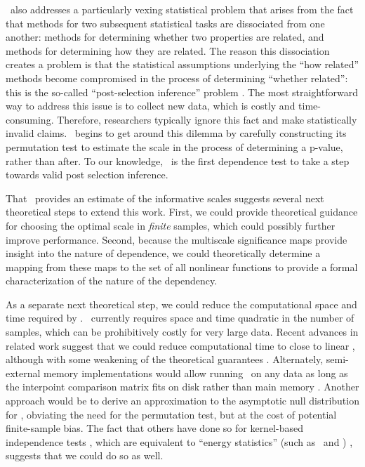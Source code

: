 \documentclass[11pt]{article}
\begin{document}
\Mgc~also addresses a particularly vexing statistical problem that arises from the fact that methods for two subsequent statistical tasks are dissociated from one another: methods for determining whether two properties are related, and methods for determining how they are related.
The reason this dissociation creates a problem is that the statistical assumptions underlying the ``how related'' methods become compromised in the process of determining ``whether related'': this is the so-called ``post-selection inference'' problem \cite{berk2013valid}.
The most straightforward way to address this issue is to collect new data, which is costly and time-consuming. Therefore, researchers typically ignore this fact and make statistically invalid claims.
\Mgc~begins to get around this dilemma by carefully constructing its permutation test to estimate the scale in the process of determining a p-value, rather than after.
To our knowledge, \Mgc~is the first dependence test to take a step towards valid post selection inference.    

That \Mgc~provides an estimate of the informative scales suggests several next theoretical steps to extend this work. 
First, we could provide theoretical guidance for choosing the optimal scale in \emph{finite} samples, which could possibly further improve performance.  Second, because the multiscale significance maps provide insight into the nature of dependence, we could theoretically determine a mapping from these maps to the set of all nonlinear functions to provide a formal characterization of the nature of the dependency. 


As a separate next theoretical step, we could reduce the computational space and time required by \Mgc.  \Mgc~currently requires space and time quadratic in the number of samples, which can be prohibitively costly for very large data.  Recent advances in related work suggest that we could reduce computational time to close to linear  \cite{Huo2016}, although with some weakening of the theoretical guarantees \cite{zhang2017large}. Alternately, semi-external memory implementations would allow running \Mgc~on any data as long as the interpoint comparison matrix fits on disk rather than main memory \cite{Zheng2015,Zheng2016,Zheng2016c,Zheng2016b}. Another approach would be to derive an approximation to the asymptotic null distribution for \Mgc, obviating the need for the permutation test, but at the cost of potential finite-sample  bias.  The fact that others have done so for kernel-based independence tests   \cite{GrettonEtAl2005, GrettonGyorfi2010, GrettonEtAl2012}, which are equivalent to  ``energy statistics'' (such as \Dcorr~and \Mcorr) \cite{SejdinovicEtAl2013, RamdasEtAl2015}, suggests that we could do so as well.
\end{document}
